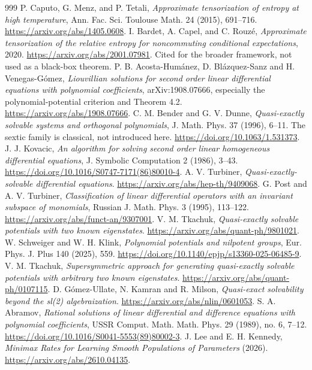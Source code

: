 \documentclass[11pt,a4paper]{article}
\theoremstyle{definition}\newtheorem{definition}[theorem]{Definition}
\theoremstyle{remark}\newtheorem{remark}[theorem]{Remark}
\numberwithin{equation}{section}
\begin{document}
\begin{thebibliography}{999}
 P. Caputo, G. Menz, and P. Tetali, \emph{Approximate tensorization of entropy at high temperature}, Ann. Fac. Sci. Toulouse Math. 24 (2015), 691--716. \url{https://arxiv.org/abs/1405.0608}.
 I. Bardet, A. Capel, and C. Rouz\'e, \emph{Approximate tensorization of the relative entropy for noncommuting conditional expectations}, 2020. \url{https://arxiv.org/abs/2001.07981}. Cited for the broader framework, not used as a black-box theorem.
 P. B. Acosta-Hum\'anez, D. Bl\'azquez-Sanz and H. Venegas-G\'omez, \emph{Liouvillian solutions for second order linear differential equations with polynomial coefficients}, arXiv:1908.07666, especially the polynomial-potential criterion and Theorem 4.2. \url{https://arxiv.org/abs/1908.07666}.
 C. M. Bender and G. V. Dunne, \emph{Quasi-exactly solvable systems and orthogonal polynomials}, J. Math. Phys. 37 (1996), 6--11. The sextic family is classical, not introduced here. \url{https://doi.org/10.1063/1.531373}.
 J. J. Kovacic, \emph{An algorithm for solving second order linear homogeneous differential equations}, J. Symbolic Computation 2 (1986), 3--43. \url{https://doi.org/10.1016/S0747-7171(86)80010-4}.
 A. V. Turbiner, \emph{Quasi-exactly-solvable differential equations}. \url{https://arxiv.org/abs/hep-th/9409068}.
 G. Post and A. V. Turbiner, \emph{Classification of linear differential operators with an invariant subspace of monomials}, Russian J. Math. Phys. 3 (1995), 113--122. \url{https://arxiv.org/abs/funct-an/9307001}.
 V. M. Tkachuk, \emph{Quasi-exactly solvable potentials with two known eigenstates}. \url{https://arxiv.org/abs/quant-ph/9801021}.
 W. Schweiger and W. H. Klink, \emph{Polynomial potentials and nilpotent groups}, Eur. Phys. J. Plus 140 (2025), 559. \url{https://doi.org/10.1140/epjp/s13360-025-06485-9}.
 V. M. Tkachuk, \emph{Supersymmetric approach for generating quasi-exactly solvable potentials with arbitrary two known eigenstates}. \url{https://arxiv.org/abs/quant-ph/0107115}.
 D. G\'omez-Ullate, N. Kamran and R. Milson, \emph{Quasi-exact solvability beyond the sl(2) algebraization}. \url{https://arxiv.org/abs/nlin/0601053}.
 S. A. Abramov, \emph{Rational solutions of linear differential and difference equations with polynomial coefficients}, USSR Comput. Math. Math. Phys. 29 (1989), no. 6, 7--12. \url{https://doi.org/10.1016/S0041-5553(89)80002-3}.
 J. Lee and E. H. Kennedy, \emph{Minimax Rates for Learning Smooth Populations of Parameters} (2026). \url{https://arxiv.org/abs/2610.04135}.

\end{thebibliography}
\end{document}
